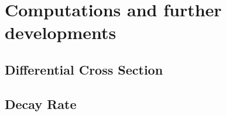 \section{Computations and further developments} \label{app:computations}

\subsection*{Differential Cross Section} \label{app:differential_cross_section}

\lipsum[1]

\subsection*{Decay Rate} \label{app:decay_rate}

\lipsum[1]